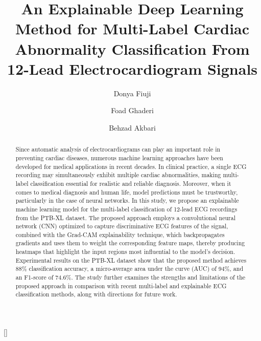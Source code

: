 \documentclass[a4paper,fleqn]{cas-dc}
\begin{document}
\let\WriteBookmarks\relax
{}

\title [mode = title]{An Explainable Deep Learning Method for Multi-Label Cardiac Abnormality Classification From 12-Lead Electrocardiogram Signals}

\author[1]{Donya Fiuji}

\author[1]{Foad Ghaderi}[]
\cormark[1]

\author[1]{Behzad Akbari}


  

\begin{abstract}
Since automatic analysis of electrocardiograms can play an important role in preventing cardiac diseases, numerous machine learning approaches have been developed for medical applications in recent decades. In clinical practice, a single ECG recording may simultaneously exhibit multiple cardiac abnormalities, making multi-label classification essential for realistic and reliable diagnosis. Moreover, when it comes to medical diagnosis and human life, model predictions must be trustworthy, particularly in the case of neural networks. In this study, we propose an explainable machine learning model for the multi-label classification of 12-lead ECG recordings from the PTB-XL dataset. The proposed approach employs a convolutional neural network (CNN) optimized to capture discriminative ECG features of the signal, combined with the Grad-CAM explainability technique, which backpropagates gradients and uses them to weight the corresponding feature maps, thereby producing heatmaps that highlight the input regions most influential to the model's decision. Experimental results on the PTB-XL dataset show that the proposed method achieves 88\% classification accuracy, a micro-average area under the curve (AUC) of 94\%, and an F1-score of 74.6\%. The study further examines the strengths and limitations of the proposed approach in comparison with recent multi-label and explainable ECG classification methods, along with directions for future work.
\end{abstract}

\end{document}
